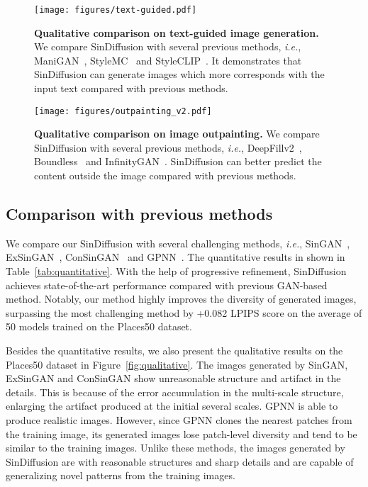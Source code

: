 \documentclass[10pt,twocolumn,letterpaper]{article}
\begin{document}
\begin{figure*}[t]
  \centering
   \texttt{[image: figures/text-guided.pdf]}
   \vspace{-7mm}
   \caption{
   \textbf{Qualitative comparison on text-guided image generation.}
   We compare SinDiffusion with several previous methods, \emph{i.e.}, ManiGAN~\cite{li2020manigan}, StyleMC~\cite{kocasari2022stylemc} and StyleCLIP~\cite{patashnik2021styleclip}.
   It demonstrates that SinDiffusion can generate images which more corresponds with the input text compared with previous methods.
   }
   \vspace{-5mm}
   \label{fig:text-guided}
\end{figure*}

\begin{figure*}[t]
  \centering
   \texttt{[image: figures/outpainting\_v2.pdf]}
   \vspace{-7mm}
   \caption{
   \textbf{Qualitative comparison on image outpainting.}
   We compare SinDiffusion with several previous methods, \emph{i.e.}, DeepFillv2~\cite{yu2019free}, Boundless~\cite{teterwak2019boundless} and InfinityGAN~\cite{lin2021infinitygan}.
   SinDiffusion can better predict the content outside the image compared with previous methods.
   }
   \vspace{-6mm}
   \label{fig:outpaint}
\end{figure*}

\subsection{Comparison with previous methods}
We compare our SinDiffusion with several challenging methods, \emph{i.e.}, SinGAN~\cite{shaham2019singan}, ExSinGAN~\cite{zhang2021exsingan}, ConSinGAN~\cite{hinz2021improved} and GPNN~\cite{granot2022drop}.
The quantitative results in shown in Table~\ref{tab:quantitative}.
With the help of progressive refinement, SinDiffusion achieves state-of-the-art performance compared with previous GAN-based method.
Notably, our method highly improves the diversity of generated images, surpassing the most challenging method by +0.082 LPIPS score on the average of 50 models trained on the Places50 dataset.

Besides the quantitative results, we also present the qualitative results on the Places50 dataset in Figure~\ref{fig:qualitative}.
The images generated by SinGAN, ExSinGAN and ConSinGAN show unreasonable structure and artifact in the details.
This is because of the error accumulation in the multi-scale structure, enlarging the artifact produced at the initial several scales.
GPNN is able to produce realistic images.
However, since GPNN clones the nearest patches from the training image, its generated images lose patch-level diversity and tend to be similar to the training images.
Unlike these methods, the images generated by SinDiffusion are with reasonable structures and sharp details and are capable of generalizing novel patterns from the training images.
\end{document}
